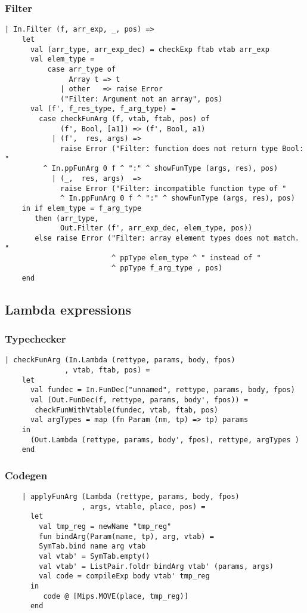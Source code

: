 \documentclass[12pt]{article}
\begin{document}
\subsubsection{Filter}

\begin{verbatim}
| In.Filter (f, arr_exp, _, pos) => 
    let 
      val (arr_type, arr_exp_dec) = checkExp ftab vtab arr_exp
      val elem_type =
          case arr_type of
               Array t => t
             | other   => raise Error 
             ("Filter: Argument not an array", pos)
      val (f', f_res_type, f_arg_type) =
        case checkFunArg (f, vtab, ftab, pos) of
             (f', Bool, [a1]) => (f', Bool, a1)
           | (f',  res, args) =>
             raise Error ("Filter: function does not return type Bool: " 
         ^ In.ppFunArg 0 f ^ ":" ^ showFunType (args, res), pos)
           | (_,  res, args)  =>
             raise Error ("Filter: incompatible function type of "
             ^ In.ppFunArg 0 f ^ ":" ^ showFunType (args, res), pos)
    in if elem_type = f_arg_type
       then (arr_type,
             Out.Filter (f', arr_exp_dec, elem_type, pos))
       else raise Error ("Filter: array element types does not match. "
                         ^ ppType elem_type ^ " instead of "
                         ^ ppType f_arg_type , pos)
    end
\end{verbatim}
\subsection{Lambda expressions}
\subsubsection{Typechecker}
\begin{verbatim}
| checkFunArg (In.Lambda (rettype, params, body, fpos)
              , vtab, ftab, pos) =
    let 
      val fundec = In.FunDec("unnamed", rettype, params, body, fpos)
      val (Out.FunDec(f, rettype, params, body', fpos)) =
       checkFunWithVtable(fundec, vtab, ftab, pos)
      val argTypes = map (fn Param (nm, tp) => tp) params
    in
      (Out.Lambda (rettype, params, body', fpos), rettype, argTypes )
    end
\end{verbatim}
\subsubsection{Codegen}
\begin{verbatim}
    | applyFunArg (Lambda (rettype, params, body, fpos)
                  , args, vtable, place, pos) =
      let
        val tmp_reg = newName "tmp_reg"
        fun bindArg(Param(name, tp), arg, vtab) = 
        SymTab.bind name arg vtab
        val vtab' = SymTab.empty()
        val vtab' = ListPair.foldr bindArg vtab' (params, args)
        val code = compileExp body vtab' tmp_reg
      in
         code @ [Mips.MOVE(place, tmp_reg)]
      end
\end{verbatim}
\end{document}
